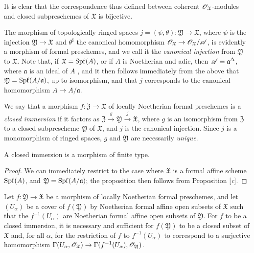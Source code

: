It is clear that the correspondence thus defined between coherent $\mathscr{O}_\mathfrak{X}$-modules and closed subpreschemes of $\mathfrak{X}$ is bijective.

The morphism of topologically ringed spaces $j=(\psi,\theta):\mathfrak{Y}\to\mathfrak{X}$, where $\psi$ is the injection $\mathfrak{Y}\to\mathfrak{X}$ and $\theta^\sharp$ the canonical homomorphism $\sh{O}_\mathfrak{X}\to\sh{O}_\mathfrak{X}/\sh{A}$, is evidently  a morphism of formal preschemes, and we call it the \emph{canonical injection} from $\mathfrak{Y}$ to $\mathfrak{X}$.
Note that, if $\mathfrak{X}=\operatorname{Spf}(A)$, or if $A$ is Noetherian and adic, then $\mathscr{A}=\mathfrak{a}^\Delta$, where $\mathfrak{a}$ is an ideal of $A$ , and it then follows immediately from the above that $\mathfrak{Y}=\operatorname{Spf}(A/\mathfrak{a})$, up to isomorphism, and that $j$ corresponds  to the canonical homomorphism $A\to A/\mathfrak{a}$.

We say that a morphism $f:\mathfrak{Z}\to\mathfrak{X}$ of locally Noetherian formal preschemes is a \emph{closed immersion} if it factors as $\mathfrak{Z}\xrightarrow{g}\mathfrak{Y}\xrightarrow{j}\mathfrak{X}$, where $g$ is an isomorphism from $\mathfrak{Z}$ to a closed subprescheme $\mathfrak{Y}$ of $\mathfrak{X}$, and $j$ is the canonical injection.
Since $j$ is a monomorphism of ringed spaces, $g$ and $\mathfrak{Y}$ are necessarily \emph{unique}.

\begin{proposition}[10.14.3]
\label{1.10.14.3}
A closed immersion is a morphism of finite type.
\end{proposition}

\begin{proof}
\label{proof-1.10.14.3}
We can immediately restrict to the case where $\mathfrak{X}$ is a formal affine scheme $\operatorname{Spf}(A)$, and $\mathfrak{Y}=\operatorname{Spf}(A/\mathfrak{a})$;
the proposition then follows from Proposition [\emph{c}].
\end{proof}

\begin{lem}[10.14.4]
\label{1.10.14.4}
Let $f:\mathfrak{Y}\to\mathfrak{X}$ be a morphism of locally Noetherian formal preschemes, and let $(U_\alpha)$ be a cover of $f(\mathfrak{Y})$ by Noetherian formal affine open subsets of $\mathfrak{X}$ such that the $f^{-1}(U_\alpha)$ are Noetherian formal affine open subsets of $\mathfrak{Y}$.
For $f$ to be a closed immersion, it is necessary and sufficient for $f(\mathfrak{Y})$ to be a closed subset of $\mathfrak{X}$ and, for all $\alpha$, for the restriction of $f$ to $f^{-1}(U_\alpha)$ to correspond  to a surjective homomorphism $\Gamma(U_\alpha,\sh{O}_\mathfrak{X})\to\Gamma(f^{-1}(U_\alpha),\sh{O}_\mathfrak{Y})$.
\end{lem}

